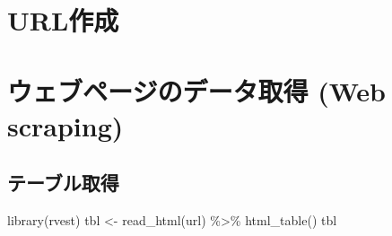 \documentclass[
]{article}
\newenvironment{Shaded}{\begin{snugshade}}{\end{snugshade}}
\newcommand{\FunctionTok}[1]{\textcolor[rgb]{0.00,0.00,0.00}{#1}}
\newcommand{\NormalTok}[1]{#1}
\newcommand{\OtherTok}[1]{\textcolor[rgb]{0.56,0.35,0.01}{#1}}
\newcommand{\SpecialCharTok}[1]{\textcolor[rgb]{0.00,0.00,0.00}{#1}}
\newcommand{\StringTok}[1]{\textcolor[rgb]{0.31,0.60,0.02}{#1}}
\begin{document}
\hypertarget{urlux4f5cux6210}{%
\section{URL作成}\label{urlux4f5cux6210}}

\begin{Shaded}
\end{Shaded}

\hypertarget{ux30a6ux30a7ux30d6ux30daux30fcux30b8ux306eux30c7ux30fcux30bfux53d6ux5f97-web-scraping}{%
\section{ウェブページのデータ取得 (Web
scraping)}\label{ux30a6ux30a7ux30d6ux30daux30fcux30b8ux306eux30c7ux30fcux30bfux53d6ux5f97-web-scraping}}

\hypertarget{ux30c6ux30fcux30d6ux30ebux53d6ux5f97}{%
\subsection{テーブル取得}\label{ux30c6ux30fcux30d6ux30ebux53d6ux5f97}}

\begin{Shaded}
\begin{Highlighting}[]
\FunctionTok{library}\NormalTok{(rvest)}
\NormalTok{tbl }\OtherTok{\textless{}{-}} \FunctionTok{read\_html}\NormalTok{(url) }\SpecialCharTok{\%\textgreater{}\%} \FunctionTok{html\_table}\NormalTok{()}
\NormalTok{tbl}
\end{Highlighting}
\end{Shaded}
\end{document}
